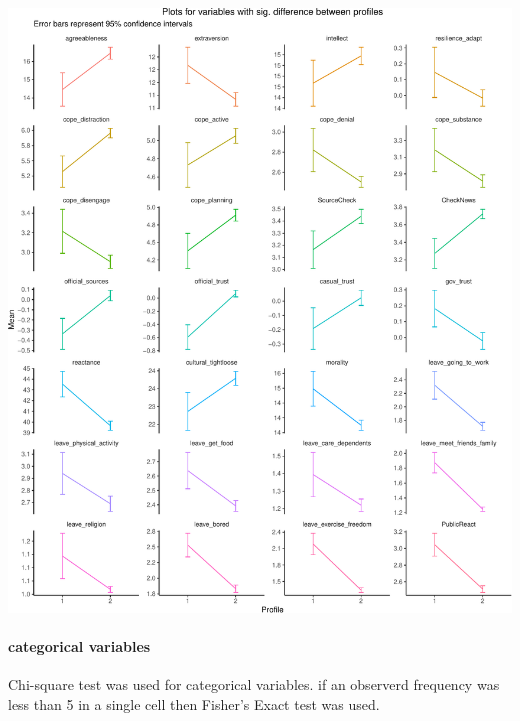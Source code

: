 \documentclass[]{article}
\let\oldparagraph\paragraph
\renewcommand{\paragraph}[1]{\oldparagraph{#1}\mbox{}}
\begin{document}
\begin{center}\includegraphics{lpa_analyses_files/figure-latex/unnamed-chunk-10-1} \end{center}

\newpage

\hypertarget{categorical-variables}{%
\paragraph{categorical variables}\label{categorical-variables}}

Chi-square test was used for categorical variables. if an observerd
frequency was less than 5 in a single cell then Fisher's Exact test was
used.
\end{document}
